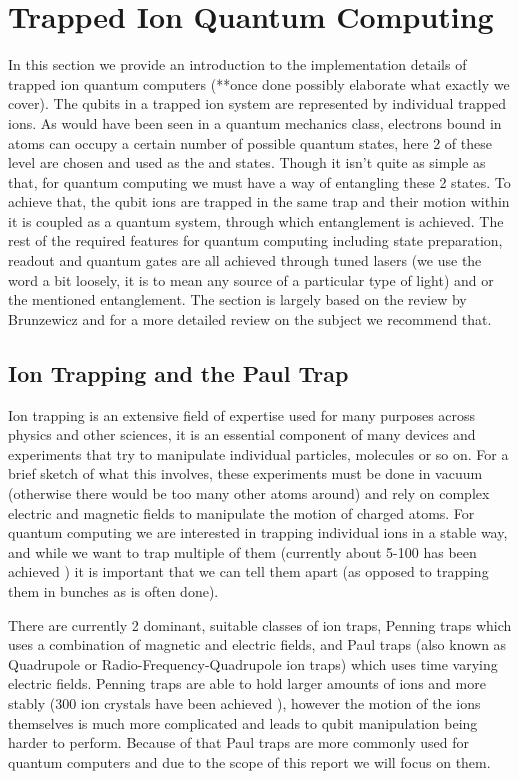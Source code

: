 
\section{Trapped Ion Quantum Computing} \label{sec:Trapped}
In this section we provide an introduction to the implementation details of trapped ion quantum computers (**once done possibly elaborate what exactly we cover).
The qubits in a trapped ion system are represented by individual trapped ions.
As would have been seen in a quantum mechanics class, electrons bound in atoms can occupy a certain number of possible quantum states, here 2 of these level are chosen and used as the \kz and \ko states.
Though it isn't quite as simple as that, for quantum computing we must have a way of entangling these 2 states.
To achieve that, the qubit ions are trapped in the same trap and their motion within it is coupled as a quantum system, through which entanglement is achieved.
The rest of the required features for quantum computing including state preparation, readout and quantum gates are all achieved through tuned lasers (we use the word a bit loosely, it is to mean any source of a particular type of light) and or the mentioned entanglement.
The section is largely based on the review by Brunzewicz \cite{bruzewiczTrappedionQuantumComputing2019} and for a more detailed review on the subject we recommend that.

\subsection{Ion Trapping and the Paul Trap}
Ion trapping is an extensive field of expertise used for many purposes across physics and other sciences, it is an essential component of many devices and experiments that try to manipulate individual particles, molecules or so on.
For a brief sketch of what this involves, these experiments must be done in vacuum (otherwise there would be too many other atoms around) and rely on complex electric and magnetic fields to manipulate the motion of charged atoms.
For quantum computing we are interested in trapping individual ions in a stable way, and while we want to trap multiple of them (currently about 5-100 has been achieved \cite{paganoCryogenicTrappedionSystem2018}) it is important that we can tell them apart (as opposed to trapping them in bunches as is often done).

There are currently 2 dominant, suitable classes of ion traps, Penning traps which uses a combination of magnetic and electric fields, and Paul traps (also known as Quadrupole or Radio-Frequency-Quadrupole ion traps) which uses time varying electric fields.
Penning traps are able to hold larger amounts of ions and more stably (300 ion crystals have been achieved \cite{bohnetQuantumSpinDynamics2016}), however the motion of the ions themselves is much more complicated and leads to qubit manipulation being harder to perform.
Because of that Paul traps are more commonly used for quantum computers and due to the scope of this report we will focus on them.

